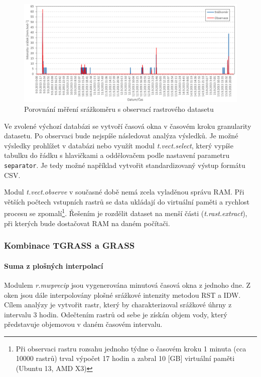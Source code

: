 \documentclass[a4paper,12pt,oneside]{report}
\begin{document}
\begin{figure}[h!]
    \centering
    \includegraphics[width=\textwidth]{./img/temporal/grafobs.png}
    \caption[Timeline]{\centering  Porovnání měření srážkoměru s observací rastrového datasetu}
 \end{figure}  



 Ve zvolené výchozí databázi se vytvoří časová okna v časovém kroku
 granularity datasetu.  Po observaci bude nejspíše následovat analýza
 výsledků. Je možné výsledky prohlížet v databázi nebo využít modul
 \textit{t.vect.select}, který vypíše tabulku do řádku s hlavičkami a
 oddělovačem podle nastavení parametru \texttt{separator}. Je tedy
 možné například vytvořit standardizovaný výstup formátu CSV.

 Modul \textit{t.vect.observe} v současné době nemá zcela vyladěnou
 správu    \acs{RAM}. Při větších počtech vstupních rastrů se data
 ukládají do virtuální paměti a rychlost procesu se
 zpomalí\footnote{Při observaci rastru rozsahu jednoho týdne o časovém
   kroku 1 minuta (cca 10000 rastrů) trval výpočet 17 hodin a zabral
   10 [GB] virtuální paměti (Ubuntu 13, AMD X3)}. Řešením je rozdělit
 dataset na menší části (\textit{t.rast.extract}), při kterých bude
 dostačovat   \acs{RAM} na daném počítači.


\subsubsection{Kombinace TGRASS a GRASS}

\paragraph*{Suma z plošných interpolací}
Modulem \emph{r.mwprecip} jsou vygenerována minutová časová okna z
jednoho dne. Z oken jsou dále interpolovány plošné srážkové intenzity
metodou RST a IDW. Cílem analýzy je vytvořit rastr, který by
charakterizoval srážkové úhrny z intervalu 3 hodin. Odečtením rastrů od sebe je získán objem vody, který představuje objemovou v daném časovém intervalu.
\end{document}
